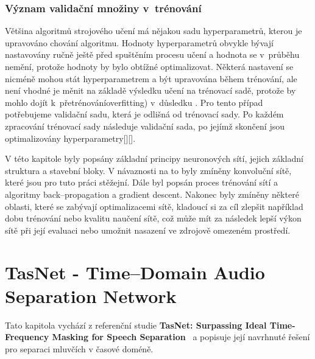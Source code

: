 \subsection{Význam validační množiny v~trénování}
Většina algoritmů strojového učení má nějakou sadu hyperparametrů, kterou je upravováno chování algoritmu. Hodnoty hyperparametrů obvykle bývají nastavovány ručně ještě před spuštěním procesu učení a hodnota se v~průběhu nemění, protože hodnoty by bylo obtížné optimalizovat. 
Některá nastavení se nicméně mohou stát hyperparametrem a být upravována během trénování, ale není vhodné je měnit na základě výsledku učení na trénovací sadě, protože by mohlo dojít k~přetrénováníoverfitting) v~důsledku . Pro tento případ potřebujeme validační sadu, která je odlišná od trénovací sady.
Po každém zpracování trénovací sady následuje validační sada, po jejímž skončení jsou optimalizovány hyperparametry[][].




\bigskip
V této kapitole byly popsány základní principy neuronových sítí, jejich základní struktura a stavební bloky. V návaznosti na to byly zmíněny konvoluční sítě, které jsou pro tuto práci stěžejní. Dále byl popsán proces trénování sítí a algoritmy back--propagation a gradient descent. Nakonec byly zmíněny některé oblasti, které se zabývají optimalizacemi sítě, kladoucí si za cíl zlepšit například dobu trénování nebo kvalitu naučení sítě, což může mít za následek lepší výkon sítě při její evaluaci nebo umožnit nasazení ve zdrojově omezeném prostředí.



\chapter{TasNet - Time--Domain Audio Separation Network}
\label{tasnet}

Tato kapitola vychází z referenční studie \textbf{TasNet: Surpassing Ideal Time-Frequency Masking for Speech Separation}~\cite{luo2018convtasnet} a popisuje její navrhnuté řešení pro separaci mluvčích v časové doméně.

